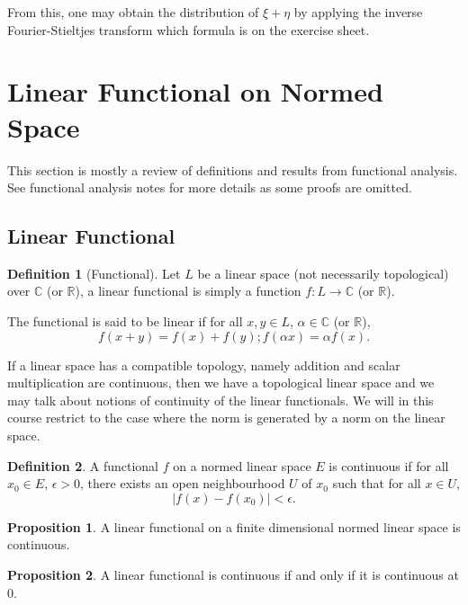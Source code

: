 \documentclass[]{article}
\theoremstyle{definition}
\theoremstyle{definition}
\newtheorem{definition}{Definition}[section]
\newtheorem{proposition}{Proposition}[section]
\begin{document}
From this, one may obtain the distribution of \(\xi + \eta\) by applying the 
inverse Fourier-Stieltjes transform which formula is on the exercise sheet.

\newpage
\section{Linear Functional on Normed Space}

This section is mostly a review of definitions and results from 
functional analysis. See functional analysis notes for more details as 
some proofs are omitted.

\subsection{Linear Functional}

\begin{definition}[Functional]
  Let \(L\) be a linear space (not necessarily topological) over 
  \(\mathbb{C}\) (or \(\mathbb{R}\)), a linear 
  functional is simply a function \(f : L \to \mathbb{C}\) (or \(\mathbb{R}\)). 

  The functional is said to be linear if for all \(x, y \in L\), 
  \(\alpha \in \mathbb{C}\) (or \(\mathbb{R}\)), 
  \[f(x + y) = f(x) + f(y); f(\alpha x) = \alpha f(x).\]
\end{definition}

If a linear space has a compatible topology, namely addition and scalar multiplication 
are continuous, then we have a topological linear space and we may talk about 
notions of continuity of the linear functionals. We will in this course 
restrict to the case where the norm is generated by a norm on the linear space.

\begin{definition}
  A functional \(f\) on a normed linear space \(E\) is continuous if for all 
  \(x_0 \in E\), \(\epsilon > 0\), there exists an open neighbourhood \(U\) of 
  \(x_0\) such that for all \(x \in U\),
  \[|f(x) - f(x_0)| < \epsilon.\]
\end{definition}

\begin{proposition}
  A linear functional on a finite dimensional normed linear space is continuous.
\end{proposition}

\begin{proposition}
  A linear functional is continuous if and only if it is continuous at 0.
\end{proposition}
\end{document}
